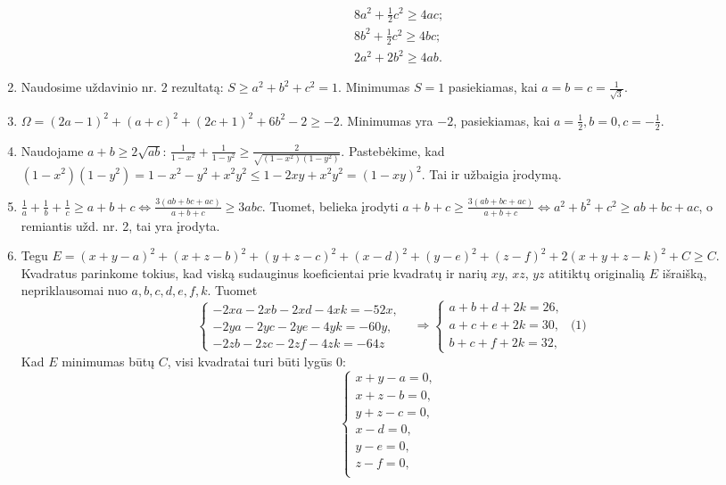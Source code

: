\begin{enumerate}
\begin{align*}
&8a^2+\frac{1}{2}c^2\geq 4ac;\\ &8b^2+\frac{1}{2}c^2\geq 4bc;\\
&2a^2+2b^2\geq4ab. \end{align*}
\item 
Naudosime uždavinio nr. 2 rezultatą: $S\geq a^2+b^2+c^2=1.$ Minimumas
$S=1$ pasiekiamas, kai $a=b=c=\frac{1}{\sqrt{3}}$.
\item 
$\Omega=(2a-1)^2+(a+c)^2+(2c+1)^2+6b^2-2\geq -2$. Minimumas yra $-2$,
pasiekiamas, kai $a=\frac{1}{2}, b=0, c=-\frac{1}{2}$.
\item 
Naudojame $a+b\geq2\sqrt{ab}$:
$\frac{1}{1-x^2}+\frac{1}{1-y^2}\geq\frac{2}{\sqrt{(1-x^2)(1-y^2)}}$.
Pastebėkime, kad
$(1-x^2)(1-y^2)=1-x^2-y^2+x^2y^2\leq1-2xy+x^2y^2=(1-xy)^2.$ Tai ir
užbaigia įrodymą.
\item 
$\frac{1}{a}+\frac{1}{b}+\frac{1}{c}\geq
a+b+c\Leftrightarrow\frac{3(ab+bc+ac)}{a+b+c}\geq3abc.$ Tuomet,
belieka įrodyti $a+b+c\geq\frac{3(ab+bc+ac)}{a+b+c}\Leftrightarrow
a^2+b^2+c^2\geq ab+bc+ac$, o remiantis užd. nr. 2, tai yra įrodyta.
\item 
Tegu
$E=(x+y-a)^2+(x+z-b)^2+(y+z-c)^2+(x-d)^2+(y-e)^2+(z-f)^2+2(x+y+z-k)^2+C
\geq C$. Kvadratus parinkome tokius, kad viską sudauginus koeficientai
prie kvadratų ir narių $xy$, $xz$, $yz$ atitiktų originalią $E$
išraišką, nepriklausomai nuo $a,b,c,d,e,f,k$. Tuomet
\begin{equation*}\left\{ \begin{array}{ll} -2xa-2xb-2xd-4xk=-52x, & \\
-2ya-2yc-2ye-4yk=-60y, & \\ -2zb-2zc-2zf-4zk=-64z & \end{array}
\right. \Rightarrow \left\{ \begin{array}{ll} a+b+d+2k=26, &  \\
a+c+e+2k=30, &  \mbox{(1)} \\ b+c+f+2k=32, & \end{array} \right.
\end{equation*} Kad $E$ minimumas būtų $C$, visi kvadratai turi būti
lygūs 0: \begin{equation*}\left\{ \begin{array}{ll} x+y-a=0, &  \\
x+z-b=0, &  \\ y+z-c=0, &  \\ x-d=0, &  \\ y-e=0, &  \\ z-f=0, &  \\

\end{array}
\end{equation*}
\end{enumerate}
